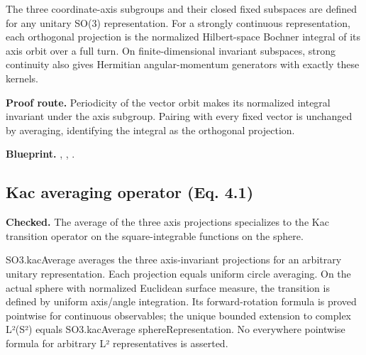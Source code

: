 The three coordinate-axis subgroups and their closed fixed subspaces are defined for any unitary SO(3) representation. For a strongly continuous representation, each orthogonal projection is the normalized Hilbert-space Bochner integral of its axis orbit over a full turn. On finite-dimensional invariant subspaces, strong continuity also gives Hermitian angular-momentum generators with exactly these kernels.

\textbf{Proof route.} Periodicity of the vector orbit makes its normalized integral invariant under the axis subgroup. Pairing with every fixed vector is unchanged by averaging, identifying the integral as the orthogonal projection.


\textbf{Blueprint.} , , .

\subsection{Kac averaging operator (Eq. 4.1)}\label{paper:kac-operator}
\textbf{Checked.} The average of the three axis projections specializes to the Kac transition operator on the square-integrable functions on the sphere. 

SO3.kacAverage averages the three axis-invariant projections for an arbitrary unitary representation. Each projection equals uniform circle averaging. On the actual sphere with normalized Euclidean surface measure, the transition is defined by uniform axis/angle integration. Its forward-rotation formula is proved pointwise for continuous observables; the unique bounded extension to complex L²(S²) equals SO3.kacAverage sphereRepresentation. No everywhere pointwise formula for arbitrary L² representatives is asserted.

